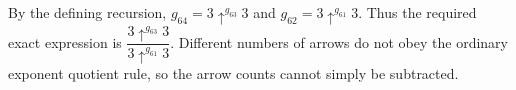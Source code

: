 By the defining recursion, $g_{64}=3\uparrow^{g_{63}}3$ and $g_{62}=3\uparrow^{g_{61}}3$. Thus the required exact expression is $\boxed{\dfrac{3\uparrow^{g_{63}}3}{3\uparrow^{g_{61}}3}}$. Different numbers of arrows do not obey the ordinary exponent quotient rule, so the arrow counts cannot simply be subtracted.
